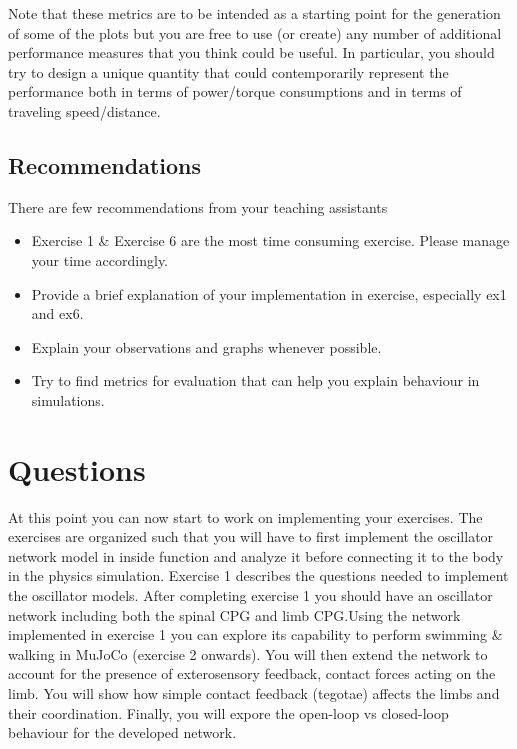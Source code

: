 \documentclass{cmc}
\begin{document}
Note that these metrics are to be intended as a starting point for the generation of some of the plots but you
are free to use (or create) any number of additional performance measures that you think could be useful.
In particular, you should try to design a unique quantity that could contemporarily represent the performance
both in terms of power/torque consumptions and in terms of traveling speed/distance.
\subsection*{Recommendations}

There are few recommendations from your teaching assistants
\begin{itemize}
\item Exercise 1 \& Exercise 6 are the most time consuming exercise. Please manage your time accordingly.
\item Provide a brief explanation of your implementation in exercise, especially ex1 and ex6.
\item Explain your observations and graphs whenever possible.
\item Try to find metrics for evaluation that can help you explain behaviour in simulations.
\end{itemize}

\newpage
\section*{Questions}
At this point you can now start to work on implementing your exercises.
The exercises are organized such that you will have to first implement the
oscillator network model in  inside  function and analyze it before
connecting it to the body in the physics simulation.  Exercise 1 describes the
questions needed to implement the oscillator models. After completing exercise
1 you should have an oscillator network including both the spinal CPG and limb
CPG.\@ Using the network implemented in exercise 1 you can explore its
capability to perform swimming \& walking in MuJoCo (exercise 2 onwards). You will then extend the network to account
for the presence of exterosensory feedback, contact forces
acting on the limb. You will show how simple contact feedback  (tegotae) affects the limbs and their coordination.
Finally, you will expore the open-loop vs closed-loop behaviour for the developed network.
\end{document}
